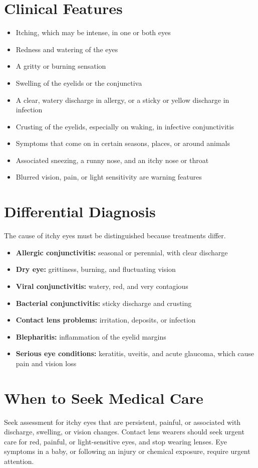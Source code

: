 \section*{Clinical Features}
\begin{itemize}
    \item Itching, which may be intense, in one or both eyes
    \item Redness and watering of the eyes
    \item A gritty or burning sensation
    \item Swelling of the eyelids or the conjunctiva
    \item A clear, watery discharge in allergy, or a sticky or yellow discharge in infection
    \item Crusting of the eyelids, especially on waking, in infective conjunctivitis
    \item Symptoms that come on in certain seasons, places, or around animals
    \item Associated sneezing, a runny nose, and an itchy nose or throat
    \item Blurred vision, pain, or light sensitivity are warning features
\end{itemize}

\section*{Differential Diagnosis}
The cause of itchy eyes must be distinguished because treatments differ.
\begin{itemize}
    \item \textbf{Allergic conjunctivitis:} seasonal or perennial, with clear discharge
    \item \textbf{Dry eye:} grittiness, burning, and fluctuating vision
    \item \textbf{Viral conjunctivitis:} watery, red, and very contagious
    \item \textbf{Bacterial conjunctivitis:} sticky discharge and crusting
    \item \textbf{Contact lens problems:} irritation, deposits, or infection
    \item \textbf{Blepharitis:} inflammation of the eyelid margins
    \item \textbf{Serious eye conditions:} keratitis, uveitis, and acute glaucoma, which cause pain and vision loss
\end{itemize}

\section*{When to Seek Medical Care}
Seek assessment for itchy eyes that are persistent, painful, or associated with discharge, swelling, or vision changes. Contact lens wearers should seek urgent care for red, painful, or light-sensitive eyes, and stop wearing lenses. Eye symptoms in a baby, or following an injury or chemical exposure, require urgent attention.

